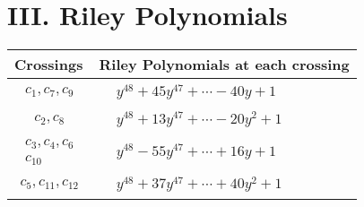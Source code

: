 \documentclass[1p]{elsarticle_modified}
\theoremstyle{definition}
\begin{document}
\centering \section*{ III. Riley Polynomials}
\begin{tabular}{m{50pt}|m{274pt}}
Crossings & \hspace{64pt}Riley Polynomials at each crossing \\
\hline $$\begin{aligned}c_{1},c_{7},c_{9}\end{aligned}$$&$\begin{aligned}
&y^{48}+45 y^{47}+\cdots-40 y+1
\end{aligned}$\\
\hline $$\begin{aligned}c_{2},c_{8}\end{aligned}$$&$\begin{aligned}
&y^{48}+13 y^{47}+\cdots-20 y^2+1
\end{aligned}$\\
\hline $$\begin{aligned}c_{3},c_{4},c_{6}\\c_{10}\end{aligned}$$&$\begin{aligned}
&y^{48}-55 y^{47}+\cdots+16 y+1
\end{aligned}$\\
\hline $$\begin{aligned}c_{5},c_{11},c_{12}\end{aligned}$$&$\begin{aligned}
&y^{48}+37 y^{47}+\cdots+40 y^2+1
\end{aligned}$\\
\hline
\end{tabular}
\vskip 2pc
\end{document}
